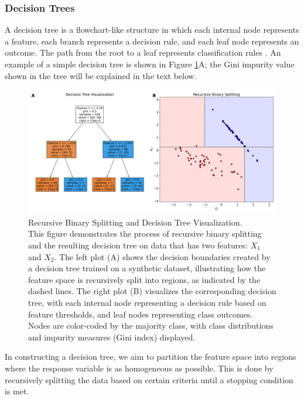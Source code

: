 \documentclass[english,11pt,a4paper,titlepage]{article}
\begin{document}
	\subsubsection*{Decision Trees}
	A decision tree is a flowchart-like structure in which each internal node represents a feature, each branch represents a decision rule, and each leaf node represents an outcome. The path from the root to a leaf represents classification rules \cite{hastieElementsStatisticalLearning2009}. An example of a simple decision tree is shown in Figure \ref{fig:decisiontreevisualization}A; the Gini impurity value shown in the tree will be explained in the text below.
	
	\begin{figure}[h]
		\centering
		\includegraphics[width=1.0\linewidth]{img/decision_tree}
		\caption{Recursive Binary Splitting and Decision Tree Visualization. \\ This figure demonstrates the process of recursive binary splitting and the resulting decision tree on data that has two features: $X_1$ and $X_2$. The left plot (A) shows the decision boundaries created by a decision tree trained on a synthetic dataset, illustrating how the feature space is recursively split into regions, as indicated by the dashed lines. The right plot (B) visualizes the corresponding decision tree, with each internal node representing a decision rule based on feature thresholds, and leaf nodes representing class outcomes. Nodes are color-coded by the majority class, with class distributions and impurity measures (Gini index) displayed.}
		\label{fig:decisiontreevisualization}
	\end{figure}
	
	In constructing a decision tree, we aim to partition the feature space into regions where the response variable is as homogeneous as possible. This is done by recursively splitting the data based on certain criteria until a stopping condition is met.
	
\end{document}
